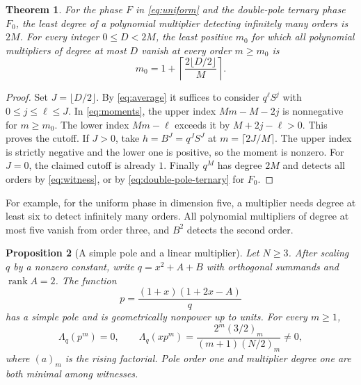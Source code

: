 \documentclass[11pt]{article}
\newtheorem{theorem}{Theorem}
\newtheorem{proposition}[theorem]{Proposition}
\newcommand{\Lq}{\Lambda_q}
\begin{document}
\begin{theorem}\label{thm:cutoff}
For the phase \(F\) in \eqref{eq:uniform} and the double-pole ternary
phase \(F_0\), the least degree of a polynomial multiplier detecting
infinitely many orders is \(2M\). For every integer \(0\le D<2M\),
the least positive \(m_0\) for which all polynomial multipliers of
degree at most \(D\) vanish at every order \(m\ge m_0\) is
\[
 m_0=1+\left\lceil\frac{2\lfloor D/2\rfloor}{M}\right\rceil .
\]
\end{theorem}

\begin{proof}
Set \(J=\lfloor D/2\rfloor\). By \eqref{eq:average} it suffices to
consider \(q^\ell S^j\) with \(0\le j\le\ell\le J\).
In \eqref{eq:moments}, the upper index \(Mm-M-2j\) is
nonnegative for \(m\ge m_0\). The lower index \(Mm-\ell\) exceeds
it by \(M+2j-\ell>0\). This proves the cutoff. If \(J>0\), take
\(h=B^J=q^J S^J\) at \(m=\lceil2J/M\rceil\). The upper index is
strictly negative and the lower one is positive, so the moment is
nonzero. For \(J=0\), the claimed cutoff is already \(1\).
Finally \(q^M\) has degree \(2M\) and detects all orders by
\eqref{eq:witness}, or by \eqref{eq:double-pole-ternary} for \(F_0\).
\end{proof}

For example, for the uniform phase in dimension five, a multiplier
needs degree at least six to detect infinitely many orders. All
polynomial multipliers of degree at most five vanish from order
three, and \(B^2\) detects the second order.

\begin{proposition}[A simple pole and a linear multiplier]\label{prop:linear}
Let \(N\ge3\). After scaling \(q\) by a nonzero constant, write
\(q=x^2+A+B\) with orthogonal summands and \(\operatorname{rank}A=2\).
The function
\begin{equation}\label{eq:linear-phase}
             p=\frac{(1+x)(1+2x-A)}q
\end{equation}
has a simple pole and is geometrically nonpower up to units. For every \(m\ge1\),
\[
 \Lq(p^m)=0,\qquad
 \Lq(xp^m)=\frac{2^m(3/2)_m}{(m+1)(N/2)_m}\ne0 ,
\]
where \((a)_m\) is the rising factorial. Pole order one and multiplier
degree one are both minimal among witnesses.
\end{proposition}
\end{document}
